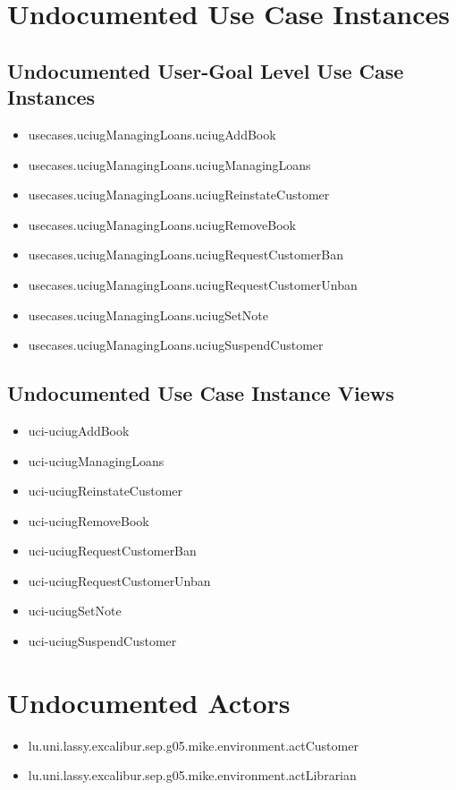 \section[Undocumented Use Case Instances]{Undocumented Use Case Instances}


\subsection[Undocumented Use Case Instances - User-Goal Level]{Undocumented User-Goal Level Use Case Instances}
\begin{itemize}
\item usecases.uciugManagingLoans.uciugAddBook 
\item usecases.uciugManagingLoans.uciugManagingLoans 
\item usecases.uciugManagingLoans.uciugReinstateCustomer 
\item usecases.uciugManagingLoans.uciugRemoveBook 
\item usecases.uciugManagingLoans.uciugRequestCustomerBan 
\item usecases.uciugManagingLoans.uciugRequestCustomerUnban 
\item usecases.uciugManagingLoans.uciugSetNote 
\item usecases.uciugManagingLoans.uciugSuspendCustomer 
\end{itemize}


\subsection[Undocumented Use Case Instance Views]{Undocumented Use Case Instance Views}
\begin{itemize}
\item uci-uciugAddBook 
\item uci-uciugManagingLoans 
\item uci-uciugReinstateCustomer 
\item uci-uciugRemoveBook 
\item uci-uciugRequestCustomerBan 
\item uci-uciugRequestCustomerUnban 
\item uci-uciugSetNote 
\item uci-uciugSuspendCustomer 
\end{itemize}


\section[Undocumented Actors]{Undocumented Actors}
\begin{itemize}
\item lu.uni.lassy.excalibur.sep.g05.mike.environment.actCustomer 
\item lu.uni.lassy.excalibur.sep.g05.mike.environment.actLibrarian 
\end{itemize}




